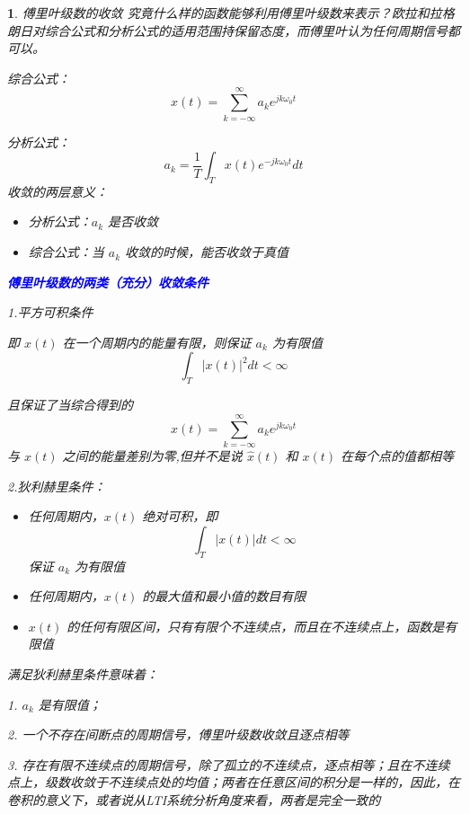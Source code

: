 \documentclass[UTF8]{report}
\theoremstyle{MyLineTheoremStyle} %
\theoremstyle{MyBlockTheoremStyle} %
\theoremstyle{MySubsubsectionStyle} %
\newtheorem{definition}{}
\begin{document}
\begin{definition}
    傅里叶级数的收敛
    究竟什么样的函数能够利用傅里叶级数来表示？欧拉和拉格朗日对综合公式和分析公式的适用范围持保留态度，而傅里叶认为任何周期信号都可以。\par
    综合公式： 
    \[
    x(t) = \sum_{k=-\infty}^{\infty} a_k e^{jk\omega_0 t}
    \]\par
    分析公式：
    \[
    a_k = \frac{1}{T} \int_{T} x(t) e^{-jk\omega_0 t} dt
    \]
    收敛的两层意义：
    \begin{itemize}
    \item 分析公式：$a_k$ 是否收敛
    \item 综合公式：当 $a_k$ 收敛的时候，能否收敛于真值
    \end{itemize}

    \textbf{\textcolor{blue}{傅里叶级数的两类（充分）收敛条件}}\par
    \vspace{1em}
    1.平方可积条件\par
    即 $x(t)$ 在一个周期内的能量有限，则保证 $a_k$ 为有限值
    \[
    \int_{T} |x(t)|^2 dt < \infty
    \]\par
    且保证了当综合得到的 
    \[
    \hat{x}(t)  = \sum_{k=-\infty}^{\infty} a_k e^{jk\omega_0 t}
    \]
    与 $x(t)$ 之间的能量差别为零,但并不是说 $\hat{x}(t)$ 和 $x(t)$ 在每个点的值都相等\par
\vspace{1em}
    2.狄利赫里条件：\par
    \begin{itemize}
    \item 任何周期内，$x(t)$ 绝对可积，即 
    \[
    \int_{T} |x(t)| dt < \infty
    \]
    保证 $a_k$ 为有限值
    \item 任何周期内，$x(t)$ 的最大值和最小值的数目有限
    \item $x(t)$ 的任何有限区间，只有有限个不连续点，而且在不连续点上，函数是有限值
    \end{itemize}
    满足狄利赫里条件意味着：\par
    1. $a_k$ 是有限值；\par
    2. 一个不存在间断点的周期信号，傅里叶级数收敛且逐点相等\par
    3. 存在有限不连续点的周期信号，除了孤立的不连续点，逐点相等；且在不连续点上，级数收敛于不连续点处的均值；两者在任意区间的积分是一样的，因此，在卷积的意义下，或者说从LTI系统分析角度来看，两者是完全一致的\par
\vspace{1em}

\end{definition}
\end{document}
